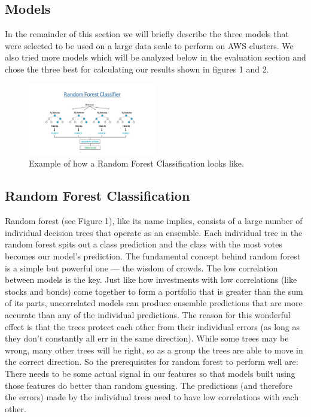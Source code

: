 \subsection{Models}

In the remainder of this section we will briefly describe the three models that were selected to be used on a large data scale to perform on AWS clusters. We also tried more models which will be analyzed below in the evaluation section and chose the three best for calculating our results shown in figures 1 and 2.

\begin{figure}[h!]
  \includegraphics[width=0.5\textwidth]{random_forest_figure}
\caption{Example of how a Random Forest Classification looks like.}
\end{figure}

\subsection{Random Forest Classification}

Random forest (see Figure 1), like its name implies, consists of a large number of individual decision trees that operate as an ensemble.
Each individual tree in the random forest spits out a class prediction and the class with the most votes becomes our model’s prediction.
The fundamental concept behind random forest is a simple but powerful one — the wisdom of crowds. The low correlation between models is the key. 
Just like how investments with low correlations (like stocks and bonds) come together to form a portfolio that is greater than the sum of its parts, uncorrelated models can produce ensemble predictions that are more accurate than any of the individual predictions.
The reason for this wonderful effect is that the trees protect each other from their individual errors (as long as they don’t constantly all err in the same direction). 
While some trees may be wrong, many other trees will be right, so as a group the trees are able to move in the correct direction. So the prerequisites for random forest to perform well are:
There needs to be some actual signal in our features so that models built using those features do better than random guessing.
The predictions (and therefore the errors) made by the individual trees need to have low correlations with each other.

